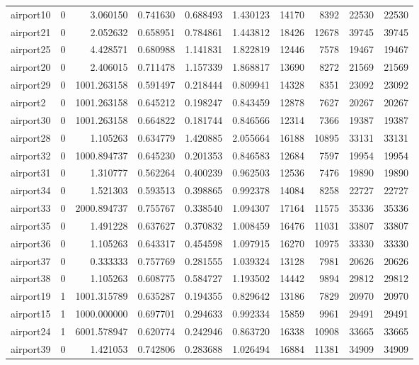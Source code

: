 \begin{longtable}{|l|r|r|r|r|r|r|r|r|r|}
airport10 & 0 & 3.060150 & 0.741630 & 0.688493 & 1.430123 & 14170 & 8392 & 22530 & 22530 \\
airport21 & 0 & 2.052632 & 0.658951 & 0.784861 & 1.443812 & 18426 & 12678 & 39745 & 39745 \\
airport25 & 0 & 4.428571 & 0.680988 & 1.141831 & 1.822819 & 12446 & 7578 & 19467 & 19467 \\
airport20 & 0 & 2.406015 & 0.711478 & 1.157339 & 1.868817 & 13690 & 8272 & 21569 & 21569 \\
airport29 & 0 & 1001.263158 & 0.591497 & 0.218444 & 0.809941 & 14328 & 8351 & 23092 & 23092 \\
airport2 & 0 & 1001.263158 & 0.645212 & 0.198247 & 0.843459 & 12878 & 7627 & 20267 & 20267 \\
airport30 & 0 & 1001.263158 & 0.664822 & 0.181744 & 0.846566 & 12314 & 7366 & 19387 & 19387 \\
airport28 & 0 & 1.105263 & 0.634779 & 1.420885 & 2.055664 & 16188 & 10895 & 33131 & 33131 \\
airport32 & 0 & 1000.894737 & 0.645230 & 0.201353 & 0.846583 & 12684 & 7597 & 19954 & 19954 \\
airport31 & 0 & 1.310777 & 0.562264 & 0.400239 & 0.962503 & 12536 & 7476 & 19890 & 19890 \\
airport34 & 0 & 1.521303 & 0.593513 & 0.398865 & 0.992378 & 14084 & 8258 & 22727 & 22727 \\
airport33 & 0 & 2000.894737 & 0.755767 & 0.338540 & 1.094307 & 17164 & 11575 & 35336 & 35336 \\
airport35 & 0 & 1.491228 & 0.637627 & 0.370832 & 1.008459 & 16476 & 11031 & 33807 & 33807 \\
airport36 & 0 & 1.105263 & 0.643317 & 0.454598 & 1.097915 & 16270 & 10975 & 33330 & 33330 \\
airport37 & 0 & 0.333333 & 0.757769 & 0.281555 & 1.039324 & 13128 & 7981 & 20626 & 20626 \\
airport38 & 0 & 1.105263 & 0.608775 & 0.584727 & 1.193502 & 14442 & 9894 & 29812 & 29812 \\
airport19 & 1 & 1001.315789 & 0.635287 & 0.194355 & 0.829642 & 13186 & 7829 & 20970 & 20970 \\
airport15 & 1 & 1000.000000 & 0.697701 & 0.294633 & 0.992334 & 15859 & 9961 & 29491 & 29491 \\
airport24 & 1 & 6001.578947 & 0.620774 & 0.242946 & 0.863720 & 16338 & 10908 & 33665 & 33665 \\
airport39 & 0 & 1.421053 & 0.742806 & 0.283688 & 1.026494 & 16884 & 11381 & 34909 & 34909 \\

\end{longtable}
